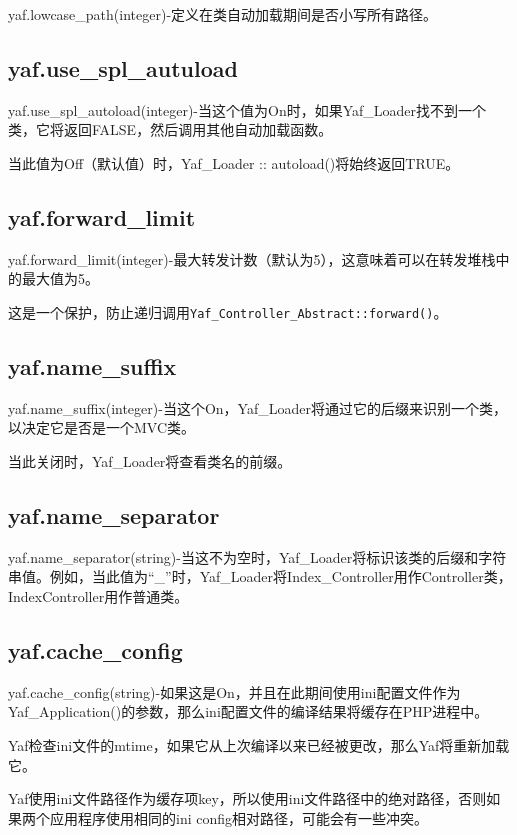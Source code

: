 yaf.lowcase\_path(integer)-定义在类自动加载期间是否小写所有路径。

\subsection{yaf.use\_spl\_autuload}

yaf.use\_spl\_autoload(integer)-当这个值为On时，如果Yaf\_Loader找不到一个类，它将返回FALSE，然后调用其他自动加载函数。

当此值为Off（默认值）时，Yaf\_Loader :: autoload()将始终返回TRUE。

\subsection{yaf.forward\_limit}

yaf.forward\_limit(integer)-最大转发计数（默认为5），这意味着可以在转发堆栈中的最大值为5。

这是一个保护，防止递归调用\texttt{Yaf\_Controller\_Abstract::forward()}。

\subsection{yaf.name\_suffix}

yaf.name\_suffix(integer)-当这个On，Yaf\_Loader将通过它的后缀来识别一个类，以决定它是否是一个MVC类。

当此关闭时，Yaf\_Loader将查看类名的前缀。

\subsection{yaf.name\_separator}

yaf.name\_separator(string)-当这不为空时，Yaf\_Loader将标识该类的后缀和字符串值。例如，当此值为“\_”时，Yaf\_Loader将Index\_Controller用作Controller类，IndexController用作普通类。

\subsection{yaf.cache\_config}

yaf.cache\_config(string)-如果这是On，并且在此期间使用ini配置文件作为Yaf\_Application()的参数，那么ini配置文件的编译结果将缓存在PHP进程中。

Yaf检查ini文件的mtime，如果它从上次编译以来已经被更改，那么Yaf将重新加载它。

Yaf使用ini文件路径作为缓存项key，所以使用ini文件路径中的绝对路径，否则如果两个应用程序使用相同的ini config相对路径，可能会有一些冲突。


